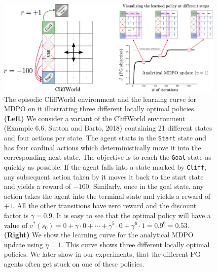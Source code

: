 \documentclass[a4paper, 10pt]{article}
\begin{document}
\begin{figure}[t]
  \centering
  \includegraphics[scale=0.36]{tabular_figures/cliffworld.pdf}
  \caption{The episodic CliffWorld environment and the learning curve for MDPO on it illustrating three different locally optimal policies. \textbf{(Left)} We consider a variant of the CliffWorld environment (Example 6.6, Sutton and Barto, 2018) containing 21 different states and four actions per state. The agent starts in the \texttt{Start} state and has four cardinal actions which deterministically move it into the corresponding next state. The objective is to reach the \texttt{Goal} state as quickly as possible. If the agent falls into a state marked by \texttt{Cliff}, any subsequent action taken by it moves it back to the start state and yields a reward of $-100$. Similarly, once in the goal state, any action takes the agent into the terminal state and yields a reward of $+1$. All the other transitions have zero reward and the discount factor is $\gamma = 0.9$. It is easy to see that the optimal policy will have a value of $v^*(s_0) = 0 + \gamma \cdot 0 + \cdots + \gamma^5 \cdot 0 + \gamma^6 \cdot 1 = 0.9^6 = 0.53$. \textbf{(Right)} We show the learning curve for the analytical MDPO update using $\eta = 1$. This curve shows three different locally optimal policies. We later show in our experiments, that the different PG agents often get stuck on one of these policies.}
  \label{fig: cliffworld}
 \end{figure}
\end{document}
